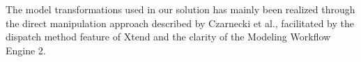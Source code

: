 The model transformations used in our solution has mainly been realized through the direct manipulation approach described by Czarnecki et al.\cite{czarnecki06}, facilitated by the dispatch method feature of Xtend and the clarity of the Modeling Workflow Engine 2.







